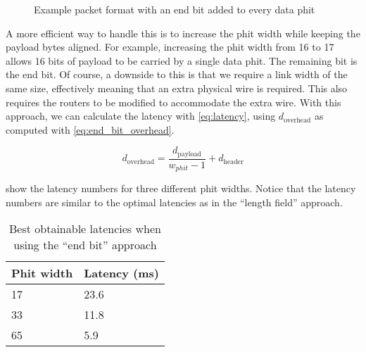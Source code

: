 \hspace*{0.5em}
\begin{figure}[hbtp]
    \centering
    \begin{adjustbox}{width=0.8\linewidth}
        
    \end{adjustbox}
    \caption{Example packet format with an end bit added to every data phit}
    \label{fig:example_packet_format_end_bit}
\end{figure}

A more efficient way to handle this is to increase the phit width while keeping the payload bytes aligned.
For example, increasing the phit width from 16 to 17 allows 16 bits of payload to be carried by a single data phit.
The remaining bit is the end bit.
Of course, a downside to this is that we require a link width of the same size, effectively meaning that an extra physical wire is required.
This also requires the routers to be modified to accommodate the extra wire.
With this approach, we can calculate the latency with \cref{eq:latency}, using $d_{\text{overhead}}$ as computed with \cref{eq:end_bit_overhead}. 

\begin{equation}
    d_{\text{overhead}} = \frac{d_{\text{payload}}}{w_{phit} - 1} + d_{\text{header}}
\label{eq:end_bit_overhead}
\end{equation}

 show the latency numbers for three different phit widths.
Notice that the latency numbers are similar to the optimal latencies as in the ``length field'' approach. 

\begin{table}[hbtp]
\centering
\begin{tabular}{@{}ll@{}}
\toprule
\textbf{Phit width} & \textbf{Latency (ms)} \\ \midrule
17        & 23.6                  \\
33        & 11.8                  \\
65        & 5.9                   \\ \bottomrule
\end{tabular}
\caption{Best obtainable latencies when using the ``end bit'' approach}
\label{tab:end_bit_latency}
\end{table}

